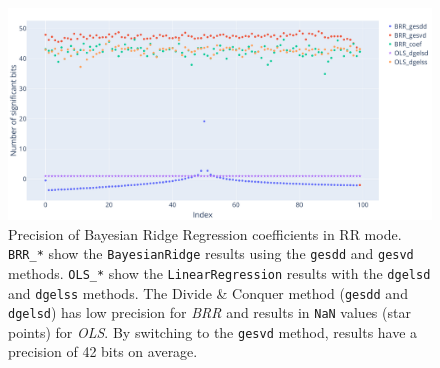 \documentclass[11pt]{article}
\begin{document}
\begin{figure}
    \centering
    \includegraphics[width=\linewidth]{figure/BRR/BRR_coefs_sig.pdf}
    \caption{Precision of Bayesian Ridge Regression coefficients in RR mode.
     \texttt{BRR\_*} show the \texttt{BayesianRidge} results
    using the \texttt{gesdd} and \texttt{gesvd} methods. 
    \texttt{OLS\_*} show the \texttt{LinearRegression} results
    with the \texttt{dgelsd} and \texttt{dgelss} methods.
   The Divide \& Conquer method 
    (\texttt{gesdd} and  \texttt{dgelsd})
    has low precision
    for \textit{BRR} and results in \texttt{NaN} values (star points) for \textit{OLS}. By switching to the \texttt{gesvd} method, 
    results have a precision of 42 bits on average.
    }
    \label{fig:brr_svd_sig}
\end{figure}



\end{document}
